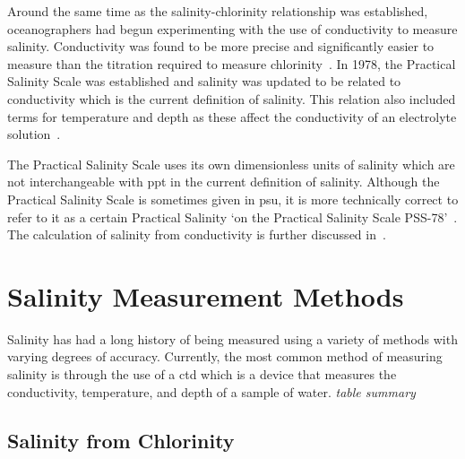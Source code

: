 Around the same time as the salinity-chlorinity relationship was established, oceanographers had begun experimenting with the use of conductivity to measure salinity.
Conductivity was found to be more precise and significantly easier to measure than the titration required to measure chlorinity~\cite{lewis_salinity_definition_and_calculation_1978}.
In 1978, the Practical Salinity Scale was established and salinity was updated to be related to conductivity which is the current definition of salinity\cite{lewis_salinity_definition_and_calculation_1978}.
This relation also included terms for temperature and depth as these affect the conductivity of an electrolyte solution~\cite{zheng_electrical_conductivity_of_ocean_2017}.

The Practical Salinity Scale uses its own dimensionless units of salinity which are not interchangeable with \gls{ppt} in the current definition of salinity.
Although the Practical Salinity Scale is sometimes given in \gls{psu}, it is more technically correct to refer to it as a certain Practical Salinity `on the Practical Salinity Scale PSS-78'~\cite{lewis_salinity_definition_and_calculation_1978}.
The calculation of salinity from conductivity is further discussed in~.


\section{Salinity Measurement Methods}\label{sec:salinity-measurement-techniques}

Salinity has had a long history of being measured using a variety of methods with varying degrees of accuracy.
Currently, the most common method of measuring salinity is through the use of a \gls{ctd} which is a device that measures the conductivity, temperature, and depth of a sample of water.
\textit{table summary}

\subsection{Salinity from Chlorinity}\label{subsec:salinity-from-chlorinity}

